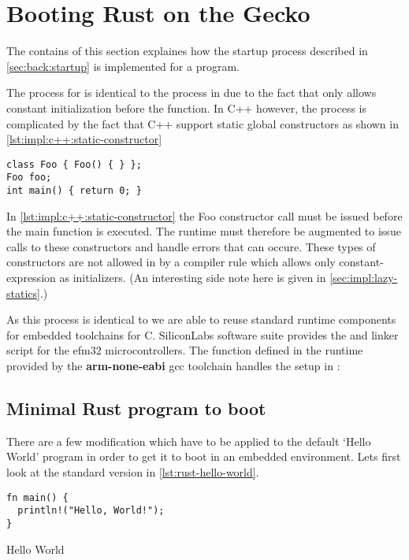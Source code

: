 \section{Booting Rust on the Gecko}
\label{sec:impl:booting}

The contains of this section explaines how the startup process described in \autoref{sec:back:startup} is implemented for a {\rust} program.

The process for {\rust} is identical to the process in {\C} due to the fact that {\rust} only allows constant initialization before the {\main} function.
In C++ however, the process is complicated by the fact that C++ support static global constructors as shown in \autoref{lst:impl:c++:static-constructor}

\begin{listing}[H]
  \begin{verbatim}
class Foo { Foo() { } };
Foo foo;
int main() { return 0; }
  \end{verbatim}
  \caption{}
  \label{lst:impl:c++:static-constructor}
\end{listing}

In \autoref{lst:impl:c++:static-constructor} the Foo constructor call must be issued before the main function is executed.
The runtime must therefore be augmented to issue calls to these constructors and handle errors that can occure.
These types of constructors are not allowed in {\rust} by a compiler rule which allows only constant-expression as initializers.
(An interesting side note here is given in \autoref{sec:impl:lazy-statics}.)

As this process is identical to {\C} we are able to reuse standard runtime components for embedded toolchains for C.
SiliconLabs software suite provides the  and linker script for the efm32 microcontrollers.
The  function defined in the {\C} runtime provided by the \textbf{arm-none-eabi} gcc toolchain handles the setup in :

\subsection{Minimal Rust program to boot}

There are a few modification which have to be applied to the default `Hello World' program in order to get it to boot in an embedded environment.
Lets first look at the standard version in \autoref{lst:rust-hello-world}.

\begin{listing}[H]
\begin{verbatim}
fn main() {
  println!("Hello, World!");
}
\end{verbatim}
\label{lst:rust-hello-world}
\caption{\rust Hello World}
\end{listing}

